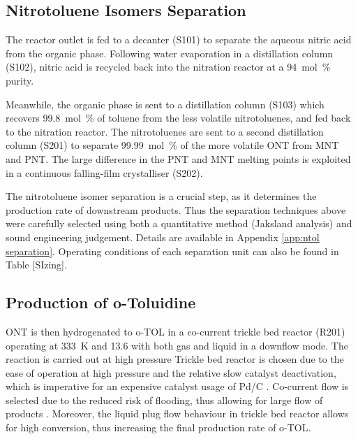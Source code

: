 
\subsection{Nitrotoluene Isomers Separation}
The reactor outlet is fed to a decanter (S101) to separate the aqueous nitric acid from the organic phase. Following water evaporation in a distillation column (S102), nitric acid is recycled back into the nitration reactor at a \SI{94}{mol\percent} purity.

Meanwhile, the organic phase is sent to a distillation column (S103) which recovers \SI{99.8}{mol\percent} of toluene from the less volatile nitrotoluenes, and fed back to the nitration reactor. The nitrotoluenes are sent to a second distillation column (S201) to separate \SI{99.99}{mol\percent} of the more volatile ONT from MNT and PNT. The large difference in the PNT and MNT melting points is exploited in a continuous falling-film crystalliser (S202). 


The nitrotoluene isomer separation is a crucial step, as it determines the production rate of downstream products. Thus the separation techniques above were carefully selected using both a quantitative method (Jaksland analysis) \cite{jaksland_separation_1995} and sound engineering judgement. Details are available in Appendix \ref{app:ntol separation}. Operating conditions of each separation unit can also be found in Table [SIzing]. 

\subsection{Production of o-Toluidine}
ONT is then hydrogenated to o-TOL in a co-current trickle bed reactor (R201) operating at \SI{333}{\K} and \SI{13.6}{\atm} with both gas and liquid in a downflow mode. The reaction is carried out at high pressure Trickle bed reactor is chosen due to the ease of operation at high pressure and the relative slow catalyst deactivation, which is imperative for an expensive catalyst usage of Pd/C \cite{vemala_hydrodynamic_nodate}. Co-current flow is selected due to the reduced risk of flooding, thus allowing for large flow of products \cite{vemala_hydrodynamic_nodate}. Moreover, the liquid plug flow behaviour in trickle bed reactor allows for high conversion, thus increasing the final production rate of o-TOL. 

